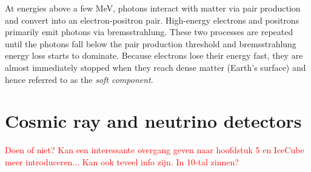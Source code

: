 At energies above a few MeV, photons interact with matter via pair production and convert into an electron-positron pair. High-energy electrons and positrons primarily emit photons via bremsstrahlung. These two processes are repeated until the photons fall below the pair production threshold and bremsstrahlung energy loss starts to dominate. Because electrons lose their energy fast, they are almost immediately stopped when they reach dense matter (Earth's surface) and hence referred to as the \textit{soft component}.



\section{Cosmic ray and neutrino detectors}
\label{sec:detectors}
\textcolor{red}{Doen of niet? Kan een interessante overgang geven naar hoofdstuk 5 en IceCube meer introduceren... Kan ook teveel info zijn. In 10-tal zinnen?}



